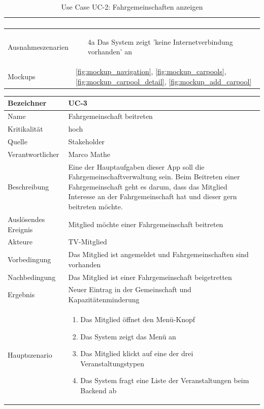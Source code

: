 \begin{table}[ht]
\begin{tabular}{ l | p{10cm} }
\begin{enumerate}
					\end{enumerate}
					\\ \hline
	Ausnahmeszenarien&	\begin{enumerate}
					\item[4a] Das System zeigt 'keine Internetverbindung vorhanden' an
					\end{enumerate}
					\\ \hline
	Mockups	 	&	\ref{fig:mockup_navigation}, \ref{fig:mockup_carpools}, \ref{fig:mockup_carpool_detail},
					\ref{fig:mockup_add_carpool}
  \end{tabular}
   \caption{Use Case UC-2: Fahrgemeinschaften anzeigen}\label{table:use_case_2}
\end{table}


\begin{table}[ht]
\centering
  \begin{tabular}{ l | p{10cm} }
	\hline
	\rowcolor{gray}
	Bezeichner		&	UC-3\\ \hline
	Name			&	Fahrgemeinschaft beitreten\\ \hline
	Kritikalität		&	hoch\\ \hline
	Quelle			&	Stakeholder\\ \hline
	Verantwortlicher	&	Marco Mathe\\ \hline
	Beschreibung	&	Eine der Hauptaufgaben dieser App soll die Fahrgemeinschaftverwaltung sein. Beim Beitreten einer Fahrgemeinschaft geht es darum, dass das Mitglied Interesse an der Fahrgemeinschaft hat und dieser gern beitreten möchte.\\ \hline
	Auslösendes Ereignis&	Mitglied möchte einer Fahrgemeinschaft beitreten\\ \hline
	Akteure		&	TV-Mitglied\\ \hline
	Vorbedingung	&	Das Mitglied ist angemeldet und Fahrgemeinschaften sind vorhanden\\ \hline
	Nachbedingung	&	Das Mitglied ist einer Fahrgemeinschaft beigetretten\\ \hline
	Ergebnis		&	Neuer Eintrag in der Gemeinschaft und Kapazitätenminderung\\ \hline
	Hauptszenario	&	\begin{enumerate}
					\item Das Mitglied öffnet den Menü-Knopf
					\item Das System zeigt das Menü an
					\item Das Mitglied klickt auf eine der drei Veranstaltungstypen
					\item Das System fragt eine Liste der Veranstaltungen beim Backend ab

\end{enumerate}
\end{tabular}
\end{table}

